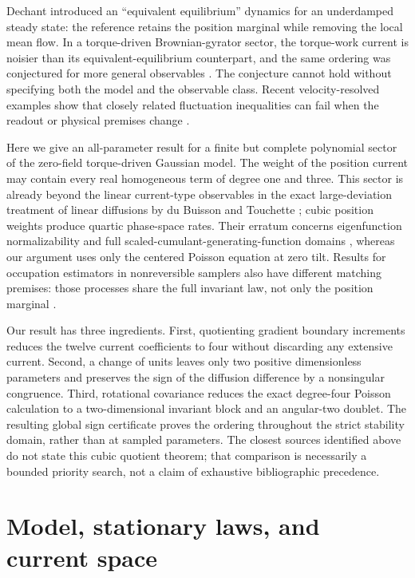 \documentclass[aps,pre,reprint,amsmath,amssymb,superscriptaddress,nofootinbib]{revtex4-2}
\begin{document}
Dechant introduced an ``equivalent equilibrium'' dynamics for an underdamped
steady state: the reference retains the position marginal while removing the
local mean flow.  In a torque-driven Brownian-gyrator sector, the torque-work
current is noisier than its equivalent-equilibrium counterpart, and the same
ordering was conjectured for more general observables
\cite{Dechant2022}.  The conjecture cannot hold without specifying both the
model and the observable class.  Recent velocity-resolved examples show that
closely related fluctuation inequalities can fail when the readout or physical
premises change \cite{VuVoBaoSaito2026}.

Here we give an all-parameter result for a finite but complete polynomial
sector of the zero-field torque-driven Gaussian model.  The weight of the
position current may contain every real homogeneous term of degree one and
three.  This sector is already beyond the linear current-type observables in
the exact large-deviation treatment of linear diffusions by du Buisson and
Touchette \cite{duBuissonTouchette2023}; cubic position weights produce
quartic phase-space rates.  Their erratum concerns eigenfunction
normalizability and full scaled-cumulant-generating-function domains
\cite{duBuissonTouchette2025Erratum}, whereas our argument uses only the
centered Poisson equation at zero tilt.  Results for occupation estimators in
nonreversible samplers also have different matching premises: those processes
share the full invariant law, not only the position marginal
\cite{CoghiChetriteTouchette2021}.

Our result has three ingredients.  First, quotienting gradient boundary
increments reduces the twelve current coefficients to four without discarding
any extensive current.  Second, a change of units leaves only two positive
dimensionless parameters and preserves the sign of the diffusion difference
by a nonsingular congruence.  Third, rotational covariance reduces the exact
degree-four Poisson calculation to a two-dimensional invariant block and an
angular-two doublet.  The resulting global sign certificate proves the
ordering throughout the strict stability domain, rather than at sampled
parameters.  The closest sources identified above do not state this cubic
quotient theorem; that comparison is necessarily a bounded priority search,
not a claim of exhaustive bibliographic precedence.

\section{Model, stationary laws, and current space}
\label{sec:model}
\end{document}
